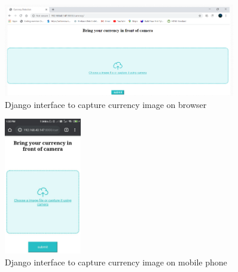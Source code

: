 \begin{figure}
	\centering
	\includegraphics[width=0.9\textwidth]{CHAPTERS/x1.PNG}
	\caption{Django interface to capture currency image on browser}
\end{figure}
\begin{figure}
	\centering
	\includegraphics[width=0.3\textwidth]{CHAPTERS/I1.jpeg}
	\caption{Django interface to capture currency image on mobile phone}
\end{figure}
